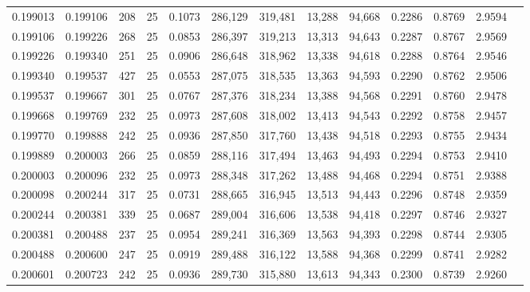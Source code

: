 \begin{tabular}{rrrrrrrrrrrrr}
0.199013 & 0.199106 &   208 &  25 &                                     0.1073 & 286,129 & 319,481 &  13,288 &  94,668 & 0.2286 & 0.8769 & 2.9594 \\
0.199106 & 0.199226 &   268 &  25 &                                     0.0853 & 286,397 & 319,213 &  13,313 &  94,643 & 0.2287 & 0.8767 & 2.9569 \\
0.199226 & 0.199340 &   251 &  25 &                                     0.0906 & 286,648 & 318,962 &  13,338 &  94,618 & 0.2288 & 0.8764 & 2.9546 \\
0.199340 & 0.199537 &   427 &  25 &                                     0.0553 & 287,075 & 318,535 &  13,363 &  94,593 & 0.2290 & 0.8762 & 2.9506 \\
0.199537 & 0.199667 &   301 &  25 &                                     0.0767 & 287,376 & 318,234 &  13,388 &  94,568 & 0.2291 & 0.8760 & 2.9478 \\
0.199668 & 0.199769 &   232 &  25 &                                     0.0973 & 287,608 & 318,002 &  13,413 &  94,543 & 0.2292 & 0.8758 & 2.9457 \\
0.199770 & 0.199888 &   242 &  25 &                                     0.0936 & 287,850 & 317,760 &  13,438 &  94,518 & 0.2293 & 0.8755 & 2.9434 \\
0.199889 & 0.200003 &   266 &  25 &                                     0.0859 & 288,116 & 317,494 &  13,463 &  94,493 & 0.2294 & 0.8753 & 2.9410 \\
0.200003 & 0.200096 &   232 &  25 &                                     0.0973 & 288,348 & 317,262 &  13,488 &  94,468 & 0.2294 & 0.8751 & 2.9388 \\
0.200098 & 0.200244 &   317 &  25 &                                     0.0731 & 288,665 & 316,945 &  13,513 &  94,443 & 0.2296 & 0.8748 & 2.9359 \\
0.200244 & 0.200381 &   339 &  25 &                                     0.0687 & 289,004 & 316,606 &  13,538 &  94,418 & 0.2297 & 0.8746 & 2.9327 \\
0.200381 & 0.200488 &   237 &  25 &                                     0.0954 & 289,241 & 316,369 &  13,563 &  94,393 & 0.2298 & 0.8744 & 2.9305 \\
0.200488 & 0.200600 &   247 &  25 &                                     0.0919 & 289,488 & 316,122 &  13,588 &  94,368 & 0.2299 & 0.8741 & 2.9282 \\
0.200601 & 0.200723 &   242 &  25 &                                     0.0936 & 289,730 & 315,880 &  13,613 &  94,343 & 0.2300 & 0.8739 & 2.9260 \\

\end{tabular}
